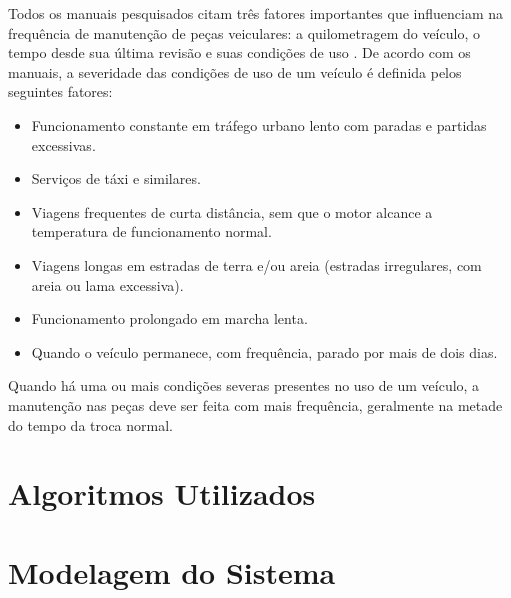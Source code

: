 \documentclass[12pt]{article}
\begin{document}
Todos os manuais pesquisados citam três fatores importantes que influenciam na
frequência de manutenção de peças veiculares: a quilometragem do veículo, o
tempo desde sua última revisão e suas condições de uso \cite{manualhyundai,
manualonix, manualka}. De acordo com os manuais, a severidade das condições de
uso de um veículo é definida pelos seguintes fatores:

\begin{itemize}
  \item Funcionamento constante em tráfego urbano lento com paradas e partidas
  excessivas.
  \item Serviços de táxi e similares.
  \item Viagens frequentes de curta distância, sem que o motor alcance a
  temperatura de funcionamento normal.
  \item Viagens longas em estradas de terra e/ou areia (estradas irregulares,
  com areia ou lama excessiva).
  \item Funcionamento prolongado em marcha lenta.
  \item Quando o veículo permanece, com frequência, parado por mais de dois
  dias.
\end{itemize}

Quando há uma ou mais condições severas presentes no uso de um veículo, a
manutenção nas peças deve ser feita com mais frequência, geralmente na metade do
tempo da troca normal.

\section{Algoritmos Utilizados} \label{sec:algoritmos}


\section{Modelagem do Sistema} \label{sec:modelagem}


%
\end{document}
